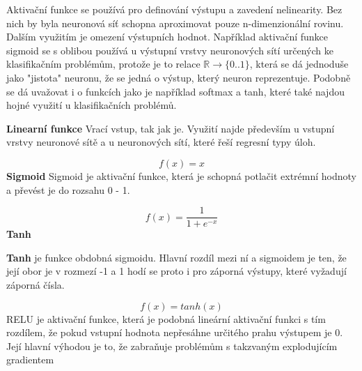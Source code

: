 Aktivační funkce se používá pro definování výstupu a zavedení nelinearity. Bez nich by byla neuronová síť schopna aproximovat pouze n-dimenzionální rovinu. \cite[s.~65]{fundementalsOfDeepLearning} \\
Dalším využitím je omezení výstupních hodnot. Například aktivační funkce sigmoid se s oblibou používá u výstupní vrstvy neuronových sítí určených ke klasifikačním problémům, protože je to relace $\mathbb{R} \rightarrow \{0..1\}$, která se dá jednoduše jako "jistota" neuronu, že se jedná o výstup, který neuron reprezentuje. Podobně se dá uvažovat i o funkcích jako je například softmax a tanh, které také najdou hojné využití u klasifikačních problémů.

\textbf{Linearní funkce}
Vrací vstup, tak jak je. Využití najde především u vstupní vrstvy neuronové sítě a u neuronových sítí, které řeší regresní typy úloh.
\\
$$f(x) = x$$
\textbf{Sigmoid}
Sigmoid je aktivační funkce, která je schopná potlačit extrémní hodnoty a převést je do rozsahu 0 - 1.\\

$$f(x) = \frac{1}{1 + e^{-x}}$$
\textbf{Tanh}

\textbf{Tanh} je funkce obdobná sigmoidu. Hlavní rozdíl mezi ní a sigmoidem je ten, že její obor je v rozmezí -1 a 1 hodí se proto i pro záporná výstupy, které vyžadují záporná čísla. \cite[s.~67]{fundementalsOfDeepLearning}

$$f(x) = tanh(x)$$
RELU je aktivační funkce, která je podobná lineární aktivační funkci s tím rozdílem, že pokud vstupní hodnota nepřesáhne určitého prahu výstupem je 0. Její hlavní výhodou je to, že zabraňuje problémům s takzvaným explodujícím gradientem \cite[s.~69]{fundementalsOfDeepLearning} \\

